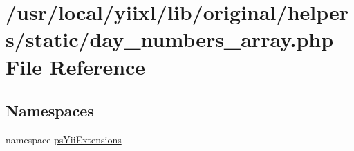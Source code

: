 \hypertarget{day__numbers__array_8php}{
\section{/usr/local/yiixl/lib/original/helpers/static/day\_\-numbers\_\-array.php File Reference}
\label{day__numbers__array_8php}
}
\subsection*{Namespaces}
\begin{DoxyCompactItemize}
\item 
namespace \hyperlink{namespacepsYiiExtensions}{psYiiExtensions}
\end{DoxyCompactItemize}
